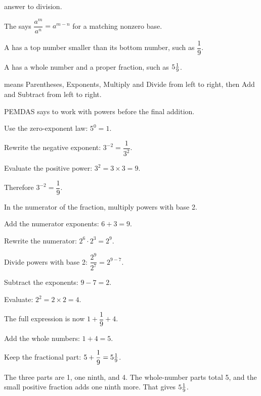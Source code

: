 \begin{words}
    answer to division.
  \item The says $\dfrac{a^{m}}{a^{n}} = a^{m-n}$
    for a matching nonzero base.
  \item A has a top number smaller than its bottom number,
    such as $\dfrac{1}{9}$.
  \item A has a whole number and a proper fraction, such as
    $5\tfrac{1}{9}$.
  \item {}means Parentheses, Exponents, Multiply and Divide from left
    to right, then Add and Subtract from left to right.
\end{words}

\begin{steps}
  \item PEMDAS says to work with powers before the final addition.
  \item Use the zero-exponent law: $5^{0} = 1$.
  \item Rewrite the negative exponent: $3^{-2} = \dfrac{1}{3^{2}}$.
  \item Evaluate the positive power: $3^{2} = 3 \times 3 = 9$.
  \item Therefore $3^{-2} = \dfrac{1}{9}$.
  \item In the numerator of the fraction, multiply powers with base 2.
  \item Add the numerator exponents: $6 + 3 = 9$.
  \item Rewrite the numerator: $2^{6} \cdot 2^{3} = 2^{9}$.
  \item Divide powers with base 2: $\dfrac{2^{9}}{2^{7}} = 2^{9-7}$.
  \item Subtract the exponents: $9 - 7 = 2$.
  \item Evaluate: $2^{2} = 2 \times 2 = 4$.
  \item The full expression is now $1 + \dfrac{1}{9} + 4$.
  \item Add the whole numbers: $1 + 4 = 5$.
  \item Keep the fractional part: $5 + \dfrac{1}{9} = 5\tfrac{1}{9}$.
\end{steps}


The three parts are 1, one ninth, and 4. The whole-number parts total 5, and the
small positive fraction adds one ninth more. That gives $5\tfrac{1}{9}$.

